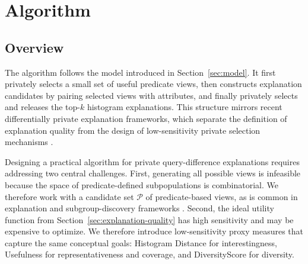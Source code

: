 
\section{Algorithm}\label{sec:solution}

\subsection{Overview}
\label{subsec:algorithm-overview}

The algorithm follows the model introduced in Section~\ref{sec:model}.
It first privately selects a small set of useful predicate views, then constructs explanation candidates by pairing selected views with attributes, and finally privately selects and releases the top-$k$ histogram explanations.
This structure mirrors recent differentially private explanation frameworks, which separate the definition of explanation quality from the design of low-sensitivity private selection mechanisms \cite{TaoGMR22}.

Designing a practical algorithm for private query-difference explanations requires addressing two central challenges.
First, generating all possible views is infeasible because the space of predicate-defined subpopulations is combinatorial.
We therefore work with a candidate set $\mathcal{P}$ of predicate-based views, as is common in explanation and subgroup-discovery frameworks \cite{FEDEX,ICDE23}.
Second, the ideal utility function from Section~\ref{sec:explanation-quality} has high sensitivity and may be expensive to optimize.
We therefore introduce low-sensitivity proxy measures that capture the same conceptual goals: Histogram Distance for interestingness, Usefulness for representativeness and coverage, and DiversityScore for diversity.

